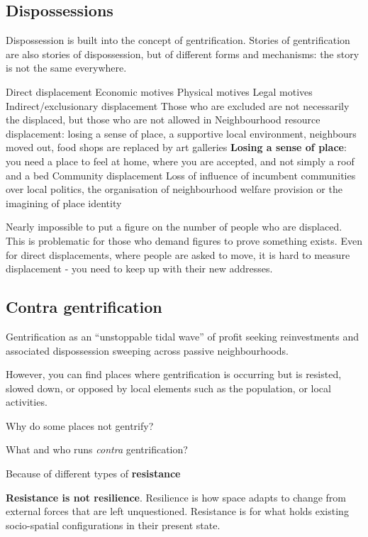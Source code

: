 \documentclass{article}
\begin{document}
\subsection{Dispossessions}

Dispossession is built into the concept of gentrification. Stories of gentrification are also stories of dispossession, but of different forms and mechanisms: the story is not the same everywhere.

\begin{outline}
	\1 Direct displacement
		\2 Economic motives
		\2 Physical motives
		\2 Legal motives
	\1 Indirect/exclusionary displacement
		\2 Those who are excluded are not necessarily the displaced, but those who are not allowed in
	\1 Neighbourhood resource displacement: losing a sense of place, a supportive local environment, neighbours moved out, food shops are replaced by art galleries
		\2 \textbf{Losing a sense of place}: you need a place to feel at home, where you are accepted, and not simply a roof and a bed
	\1 Community displacement
		\2 Loss of influence of incumbent communities over local politics, the organisation of neighbourhood welfare provision or the imagining of place identity
\end{outline}

Nearly impossible to put a figure on the number of people who are displaced. This is problematic for those who demand figures to prove something exists. Even for direct displacements, where people are asked to move, it is hard to measure displacement - you need to keep up with their new addresses. 

\subsection{Contra gentrification}

Gentrification as an ``unstoppable tidal wave'' of profit seeking reinvestments and associated dispossession sweeping across passive neighbourhoods.

However, you can find places where gentrification is occurring but is resisted, slowed down, or opposed by local elements such as the population, or local activities. 

Why do some places not gentrify?

What and who runs \textit{contra} gentrification?

Because of different types of \textbf{resistance}

\textbf{Resistance is not resilience}.
Resilience is how space adapts to change from external forces that are left unquestioned.
Resistance is for what holds existing socio-spatial configurations in their present state.
\end{document}
